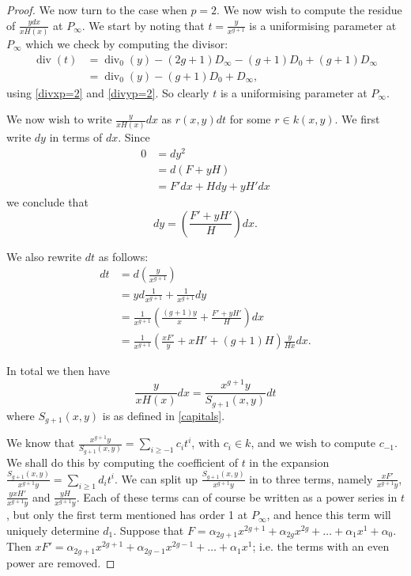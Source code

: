 \documentclass[draft, 11pt]{article} %
\theoremstyle{plain}
\theoremstyle{remark}
\DeclareMathOperator{\di}{div}
\begin{document}
\begin{proof}
We now turn to the case when $p=2$.
We now wish to compute the residue of $\frac{ydx}{xH(x)}$ at $P_\infty$.
We start by noting that $t = \frac{y}{x^{g+1}}$ is a uniformising parameter at $P_\infty$ which we check by computing the divisor:
\begin{align*}
\di(t) & = \di_0(y) - (2g+1)D_\infty -(g+1)D_0 + (g+1)D_\infty \\
& = \di_0(y)-(g+1)D_0 + D_\infty,
\end{align*}
using \eqref{divxp=2} and \eqref{divyp=2}.
So clearly $t$ is a uniformising parameter at $P_\infty$.

We now wish to write $\frac{y}{xH(x)}dx$ as $r(x,y)dt$ for some $r \in k(x,y)$.
We first write $dy$ in terms of $dx$.
Since
\begin{align*}
0 & =  dy^2 \\
& =  d(F+yH) \\
& =  F'dx + Hdy + yH'dx
\end{align*}
we conclude that
\[
dy = \left( \frac{F'+yH'}{H} \right) dx.
\]

We also rewrite $dt$ as follows:
\begin{align*}
dt & =  d\left( \frac{y}{x^{g+1}} \right) \\
& =  yd\frac{1}{x^{g+1}} + \frac{1}{x^{g+1}}dy \\
& =  \frac{1}{x^{g+1}} \left( \frac{(g+1)y}{x} + \frac{F'+yH'}{H} \right) dx \\
& =  \frac{1}{x^{g+1}} \left( \frac{xF'}{y} + xH' + (g+1)H \right) \frac{y}{Hx} dx.
\end{align*}

In total we then have
\[
\frac{y}{xH(x)}dx = \frac{x^{g+1}y}{S_{g+1}(x,y)}dt
\]
where $S_{g+1}(x,y)$ is as defined in \eqref{capitals}.

We know that $\frac{x^{g+1}y}{S_{g+1}(x,y)} = \sum_{i\geq -1} c_i t^i$, with $c_i \in k$, and we wish to compute $c_{-1}$.
We shall do this by computing the coefficient of $t$ in the expansion $\frac{S_{g+1}(x,y)}{x^{g+1}y} = \sum_{i\geq 1}d_it^i$.
We can split up $\frac{S_{g+1}(x,y)}{x^{g+1}y}$ in to three terms, namely $\frac{xF'}{x^{g+1}y}$, $\frac{yxH'}{x^{g+1}y}$ and $\frac{yH}{x^{g+1}y}$.
Each of these terms can of course be written as a power series in $t$, but only the first term mentioned has order 1 at $P_\infty$, and hence this term will uniquely determine $d_1$.
Suppose that $F = \alpha_{2g+1}x^{2g+1} + \alpha_{2g}x^{2g} + \ldots + \alpha_1x^1 + \alpha_0$.
Then $xF'= \alpha_{2g+1}x^{2g+1} + \alpha_{2g-1}x^{2g-1} + \ldots + \alpha_1x^1$; i.e. the terms with an even power are removed.


\end{proof}
\end{document}

